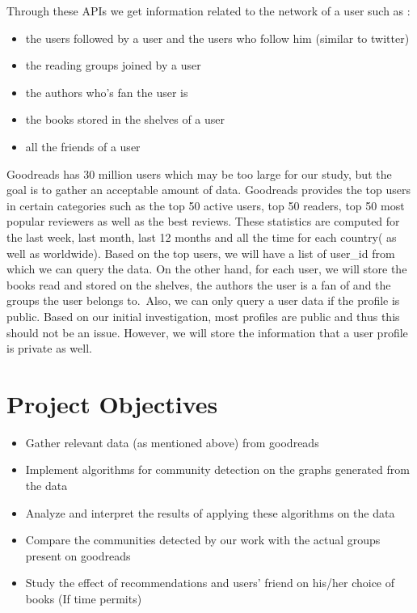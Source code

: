 \documentclass[11pt]{article}
\begin{document}
Through these APIs we get information related to the network of a user such as :
\begin{itemize}
\item the users followed by a user and the users who follow him (similar to twitter)
\item the reading groups joined by a user
\item the authors who's fan the user is
\item the books stored in the shelves of a user
\item all the friends of a user
\end{itemize}

Goodreads has 30 million users which may be too large for our study, but the goal is to gather an acceptable amount of data. Goodreads provides the top users in certain categories such as the top 50 active users, top 50 readers, top 50 most popular reviewers as well as the best reviews. These statistics are computed for the last week, last month, last 12 months and all the time for each country( as well as worldwide).
Based on the top users, we will have a list of user\_id from which we can query the data. On the other hand, for each user, we will store the books read and stored on the shelves, the authors the user is a fan of and the groups the user belongs to.\
Also, we  can only query a user data if the profile is public. Based on our initial investigation, most profiles are public and thus this  should not be an issue. However, we will store the information that a user profile is private as well.

\section{Project Objectives}


\begin{itemize}
\item Gather relevant data (as mentioned above) from goodreads
\item Implement algorithms for community detection on the graphs generated from the data
\item Analyze and interpret the results of applying these algorithms on the data
\item Compare the communities detected by our work with the actual groups present on goodreads
\item Study the effect of recommendations and users' friend on his/her choice of books (If time permits)
\end{itemize}
\end{document}

